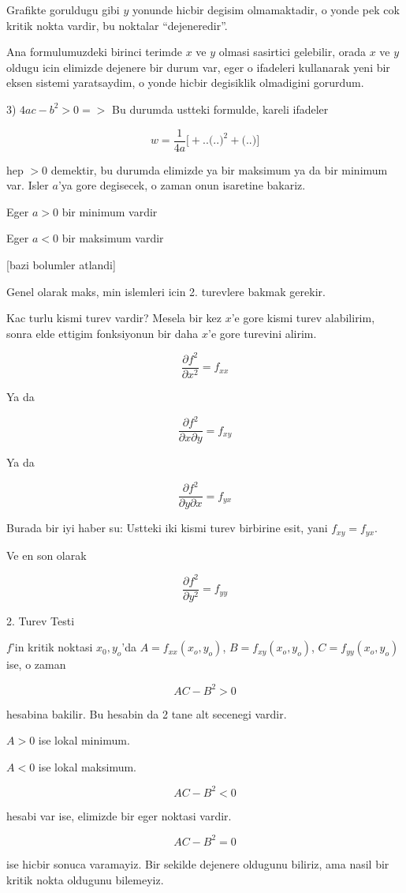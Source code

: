 \documentclass[12pt,fleqn]{article}
\begin{document}
Grafikte goruldugu gibi $y$ yonunde hicbir degisim olmamaktadir, o yonde
pek cok kritik nokta vardir, bu noktalar ``dejeneredir''. 

Ana formulumuzdeki birinci terimde $x$ ve $y$ olmasi sasirtici gelebilir,
orada $x$ ve $y$ oldugu icin elimizde dejenere bir durum var, eger o
ifadeleri kullanarak yeni bir eksen sistemi yaratsaydim, o yonde hicbir
degisiklik olmadigini gorurdum.

3) $4ac - b^2 > 0 => $ Bu durumda ustteki formulde, kareli ifadeler 

\[w = \frac{1}{4a} 
\bigg[
+ .. \bigg( .. \bigg)^2 +
\bigg( .. \bigg)
\bigg]
\]

hep $>0$ demektir, bu durumda elimizde ya bir maksimum ya da bir minimum
var. Isler $a$'ya gore degisecek, o zaman onun isaretine bakariz. 

Eger $a > 0$ bir minimum vardir

Eger $a < 0$ bir maksimum vardir

[bazi bolumler atlandi]

Genel olarak maks, min islemleri icin 2. turevlere bakmak gerekir. 

Kac turlu kismi turev vardir? Mesela bir kez $x$'e gore kismi turev alabilirim,
sonra elde ettigim fonksiyonun bir daha $x$'e gore turevini alirim. 

\[ \frac{\partial f^2}{\partial x^2} = f_{xx}\]

Ya da

\[ 
\frac{\partial f^2}{\partial x \partial y} = f_{xy}
 \]

Ya da 

\[ 
\frac{\partial f^2}{\partial y \partial x} = f_{yx}
 \]

Burada bir iyi haber su: Ustteki iki kismi turev birbirine esit, yani
$f_{xy} = f_{yx}$.

Ve en son olarak

\[ \frac{\partial f^2}{\partial y^2} = f_{yy}\]

2. Turev Testi

$f$'in kritik noktasi $x_0,y_o$'da $A = f_{xx}(x_o,y_o)$, $B =
f_{xy}(x_o,y_o)$, 
$C = f_{yy}(x_o,y_o)$ ise, o zaman 

\[ AC - B^2 > 0 \]

hesabina bakilir. Bu hesabin da 2 tane alt secenegi vardir. 

$A > 0$ ise lokal minimum. 

$A < 0$ ise lokal maksimum. 

\[ AC - B^2 < 0 \]

hesabi var ise, elimizde bir eger noktasi vardir. 

\[ AC - B^2 = 0 \]

ise hicbir sonuca varamayiz. Bir sekilde dejenere oldugunu biliriz, ama
nasil bir kritik nokta oldugunu bilemeyiz. 
\end{document}
